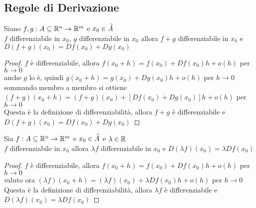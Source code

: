 \subsection{Regole di Derivazione}\label{sect:regole_deriv}
\proposition
\label{prop:diff_somma_diff}
Siano $f,g: A\subseteq \mathbb{R}^n \to \mathbb{R}^m$ e $x_0\in\accentset{\circ}{A}$\\
$f$ differenziabile in $x_0$, $g$ differenziabile in $x_0$ allora $f+g$ differenziabile in $x_0$ e $D(f+g)(x_0) = Df(x_0)+Dg(x_0)$
\begin{proof}
	$f$ è differenziabile, allora $f(x_0+h)=f(x_0)+Df(x_0)h+o(h)$ per $h \to 0$\\
	anche $g$ lo è, quindi $g(x_0+h)=g(x_0)+Dg(x_0)h+o(h)$ per $h \to 0$\\
	sommando membro a membro si ottiene  $(f+g)(x_0+h)=(f+g)(x_0)+[Df(x_0)+Dg(x_0)]h+o(h)$ per $h \to 0$\\
	Questa è la definizione di differenziabilità, allora $f+g$ è differenziabile e $D(f+g)(x_0) = Df(x_0)+Dg(x_0)$
\end{proof}

\proposition
Sia $f: A\subseteq \mathbb{R}^n \to \mathbb{R}^m$ e $x_0\in\accentset{\circ}{A}$ e $\lambda\in \mathbb{R}$\\
$f$ differenziabile in $x_0$ allora $\lambda f$ differenziabile in $x_0$ e $D(\lambda f)(x_0) = \lambda Df(x_0)$
\begin{proof}
	$f$ è differenziabile, allora $f(x_0+h)=f(x_0)+Df(x_0)h+o(h)$ per $h \to 0$\\
	valuto ora $(\lambda f)(x_0+h)=(\lambda f)(x_0)+\lambda Df(x_0)h+o(h)$ per $h \to 0$\\
	Questa è la definizione di differenziabilità, allora $\lambda f$ è differenziabile e $D(\lambda f)(x_0) = \lambda Df(x_0)$
\end{proof}

